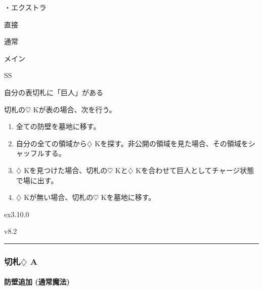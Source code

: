 \documentclass[letterpaper,10pt,dvipdfmx]{sphinxmanual}
\begin{document}
\sphinxAtStartPar
・エクストラ

\sphinxAtStartPar
{} 直接

\sphinxAtStartPar
{} 通常

\sphinxAtStartPar
{} メイン

\sphinxAtStartPar
{} SS

\sphinxAtStartPar
{}

\sphinxAtStartPar
自分の表切札に「巨人」がある

\sphinxAtStartPar
{}

\sphinxAtStartPar
切札の{\normalsize $\heartsuit$} Kが表の場合、次を行う。
\begin{enumerate}
%
\item {} 
\sphinxAtStartPar
全ての防壁を墓地に移す。

\item {} 
\sphinxAtStartPar
自分の全ての領域から{\normalsize $\diamondsuit$} Kを探す。非公開の領域を見た場合、その領域をシャッフルする。

\item {} 
\sphinxAtStartPar
{\normalsize $\diamondsuit$} Kを見つけた場合、切札の{\normalsize $\heartsuit$} Kと{\normalsize $\diamondsuit$} Kを合わせて巨人としてチャージ状態で場に出す。

\item {} 
\sphinxAtStartPar
{\normalsize $\diamondsuit$} Kが無い場合、切札の{\normalsize $\heartsuit$} Kを墓地に移す。

\end{enumerate}

\sphinxAtStartPar
{}  ex3.10.0

\sphinxAtStartPar
{}  v8.2


\bigskip\hrule\bigskip



\subsubsection{切札{\normalsize $\diamondsuit$} A}
\label{\detokenize{auto/frameActionlist:id51}}

\paragraph{防壁追加 (通常魔法)}
\label{\detokenize{auto/frameActionlist:act-putbulwark}}\label{\detokenize{auto/frameActionlist:id52}}
\sphinxAtStartPar
{}
\end{document}
